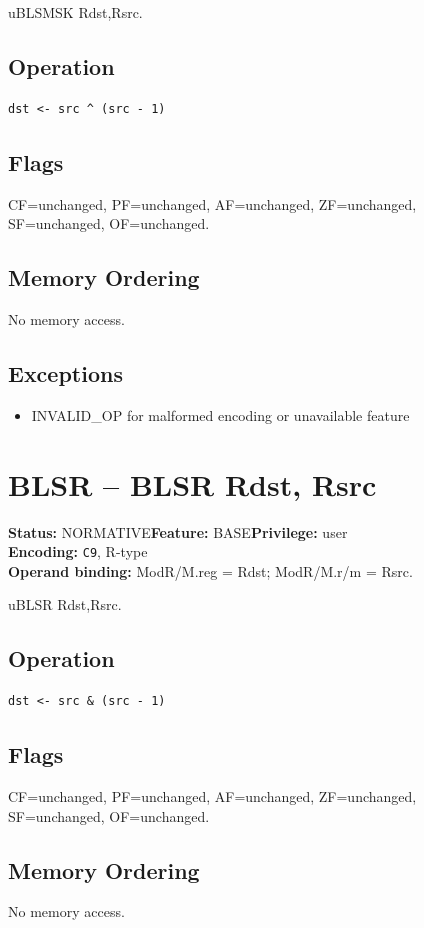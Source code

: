 \documentclass[10pt]{article}
\begin{document}
uBLSMSK Rdst,Rsrc.

\subsection*{Operation}
\begin{lstlisting}
dst <- src ^ (src - 1)
\end{lstlisting}
\subsection*{Flags}
CF=unchanged, PF=unchanged, AF=unchanged, ZF=unchanged, SF=unchanged, OF=unchanged.
\subsection*{Memory Ordering}
No memory access.
\subsection*{Exceptions}
\begin{itemize}
\item INVALID\_OP for malformed encoding or unavailable feature
\end{itemize}
\clearpage

\section{BLSR -- BLSR Rdst, Rsrc}
\textbf{Status:} NORMATIVE\quad \textbf{Feature:} BASE\quad \textbf{Privilege:} user\\
\textbf{Encoding:} \texttt{C9}, R-type\\
\textbf{Operand binding:} ModR/M.reg = Rdst; ModR/M.r/m = Rsrc.

uBLSR Rdst,Rsrc.

\subsection*{Operation}
\begin{lstlisting}
dst <- src & (src - 1)
\end{lstlisting}
\subsection*{Flags}
CF=unchanged, PF=unchanged, AF=unchanged, ZF=unchanged, SF=unchanged, OF=unchanged.
\subsection*{Memory Ordering}
No memory access.
\end{document}
